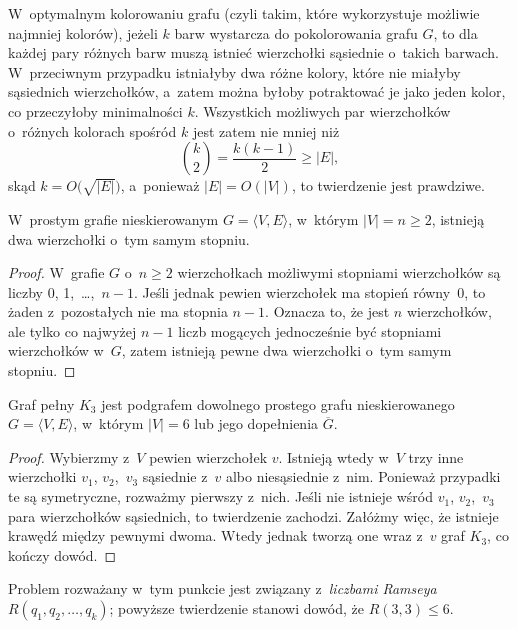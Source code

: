 \subproblem %
W~optymalnym kolorowaniu grafu (czyli takim, które wykorzystuje możliwie najmniej kolorów), jeżeli $k$ barw wystarcza do pokolorowania grafu $G$, to dla każdej pary różnych barw muszą istnieć wierzchołki sąsiednie o~takich barwach. W~przeciwnym przypadku istniałyby dwa różne kolory, które nie miałyby sąsiednich wierzchołków, a~zatem można byłoby potraktować je jako jeden kolor, co przeczyłoby minimalności $k$. Wszystkich możliwych par wierzchołków o~różnych kolorach spośród $k$ jest zatem nie mniej niż
\[
	\binom{k}{2} = \frac{k(k-1)}{2} \ge |E|,
\]
skąd $k=O\bigl(\!\sqrt{|E|}\bigr)$, a~ponieważ $|E|=O(|V|)$, to twierdzenie jest prawdziwe.


\subproblem %
\begin{twierdzenie}
	W~prostym grafie nieskierowanym $G=\langle V,E\rangle$, w~którym $|V|=n\ge2$, istnieją dwa wierzchołki o~tym samym stopniu.
\end{twierdzenie}
\begin{proof}
W~grafie $G$ o~$n\ge2$ wierzchołkach możliwymi stopniami wierzchołków są liczby 0, 1,~\dots,~$n-1$. Jeśli jednak pewien wierzchołek ma stopień równy~0, to żaden z~pozostałych nie ma stopnia $n-1$. Oznacza to, że jest $n$ wierzchołków, ale tylko co najwyżej $n-1$ liczb mogących jednocześnie być stopniami wierzchołków w~$G$, zatem istnieją pewne dwa wierzchołki o~tym samym stopniu.
\end{proof}

\subproblem %
\begin{twierdzenie}
	Graf pełny $K_3$ jest podgrafem dowolnego prostego grafu nieskierowanego $G=\langle V,E\rangle$, w~którym $|V|=6$ lub jego dopełnienia $\overline{G}$.
\end{twierdzenie}
\begin{proof}
Wybierzmy z~$V$ pewien wierzchołek $v$. Istnieją wtedy w~$V$ trzy inne wierzchołki $v_1$, $v_2$,~$v_3$ sąsiednie z~$v$ albo niesąsiednie z~nim. Ponieważ przypadki te są symetryczne, rozważmy pierwszy z~nich. Jeśli nie istnieje wśród $v_1$, $v_2$,~$v_3$ para wierzchołków sąsiednich, to twierdzenie zachodzi. Załóżmy więc, że istnieje krawędź między pewnymi dwoma. Wtedy jednak tworzą one wraz z~$v$ graf $K_3$, co kończy dowód.
\end{proof}

Problem rozważany w~tym punkcie jest związany z~\emph{liczbami Ramseya} $R(q_1,q_2,\dots,q_k)$; powyższe twierdzenie stanowi dowód, że $R(3,3)\le6$.

